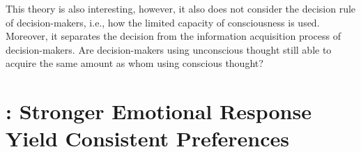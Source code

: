 \documentclass[11pt]{elegantbook}
\begin{document}
This theory is also interesting, however, it also does not consider the decision rule of decision-makers, i.e., how the limited capacity of consciousness is used. Moreover, it separates the decision from the information acquisition process of decision-makers. Are decision-makers using unconscious thought still able to acquire the same amount as whom using conscious thought?

\section{\cite{lee2009search}: Stronger Emotional Response Yield Consistent Preferences}






























































\end{document}
